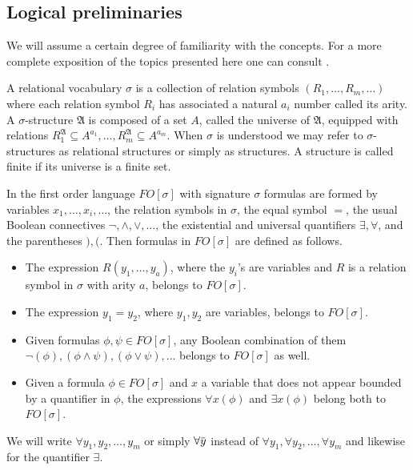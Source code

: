 \documentclass[12pt,notitlepage,a4paper]{article}
\theoremstyle{definition}
\newcommand{\overbar}[1]{\mkern 1.5mu\overline{\mkern-1.5mu#1\mkern-1.5mu}\mkern 1.5mu}
\begin{document}
\subsection{Logical preliminaries}
We will assume a certain degree of familiarity with the 
concepts. For a more complete exposition of the topics 
presented here one can consult \cite{ebbinghaus2013mathematical}.

A relational vocabulary $\sigma$ is a collection of
relation symbols $(R_1,\dots, R_m,\dots)$
where each relation symbol $R_i$ has associated a natural $a_i$
number called its arity.
A $\sigma$-structure $\mathfrak{A}$ is composed of
a set $A$, called the universe of $\mathfrak{A}$, equipped with
relations $R_1^{\mathfrak{A}}\subseteq A^{a_1},
\dots, R_m^{\mathfrak{A}}\subseteq A^{a_m}$. When $\sigma$
is understood we may refer to $\sigma$-structures as relational
structures or simply as structures.
A structure is called finite if its universe is a finite set. \par

In the first order language $FO[\sigma]$ with signature $\sigma$ 
formulas are formed by variables $x_1,\dots, x_i,\dots$,
the relation symbols in $\sigma$, the equal symbol $=$,
the usual Boolean connectives $\neg, \wedge, \vee, \dots$, 
the existential and universal quantifiers $\exists, \forall$, and
the parentheses $),($. Then formulas in $FO[\sigma]$ are defined as 
follows.
\vspace*{-0.2em}
\begin{itemize}[topsep=1pt, itemsep=1pt]
	\item The expression $R(y_1,\dots,y_a)$, where the $y_i$'s are variables and $R$
	is a relation symbol in $\sigma$ with arity $a$, belongs to $FO[\sigma]$.
	\item The expression $y_1=y_2$, where $y_1, y_2$ are variables, 
	belongs to $FO[\sigma]$.
	\item Given formulas $\phi, \psi \in FO[\sigma]$, any Boolean combination of them
	$\neg(\phi), (\phi \wedge \psi), (\phi \vee \psi), \dots$ belongs to $FO[\sigma]$ as well.
	\item Given a formula $\phi \in FO[\sigma]$ and $x$ a variable that 
	does not appear bounded
	by a quantifier in $\phi$, the expressions $\forall x (\phi)$ and 
	$\exists x (\phi)$ belong both to $FO[\sigma]$. 
\end{itemize}  
We will write $\forall y_1, y_2,\dots, y_m$ or simply $\forall \overbar{y}$
instead of  
$\forall y_1, \forall y_2,\dots, \forall y_m$ and likewise for
the quantifier $\exists$. 
\end{document}
